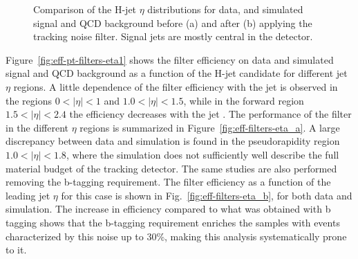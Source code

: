 \begin{figure}[!htb]
\centering
{}
\caption{Comparison of the H-jet $\eta$ distributions for data, and simulated signal and QCD background before (a) and after (b) applying the
tracking noise filter. Signal jets are mostly central in the detector.}
\label{fig:hbbjeteta}
\end{figure}

Figure~\ref{fig:eff-pt-filters-eta1} shows the filter efficiency on data and simulated signal and QCD background as a function 
of the H-jet candidate \pt for different jet $\eta$ regions.
A little dependence of the filter efficiency with the jet \pt is observed in the regions $0 < |\eta| < 1$ and $1.0 < |\eta| < 1.5$, 
while in the forward region $1.5 < |\eta| < 2.4$ the efficiency decreases with the jet \pt. 
The performance of the filter in the different $\eta$ regions is summarized in Figure~\ref{fig:eff-filters-eta_a}.
A large discrepancy between data and simulation is found in the pseudorapidity region $1.0 < |\eta| < 1.8$, 
where the simulation does not sufficiently well describe the full material budget of the tracking detector.
The same studies are also performed removing the b-tagging requirement. The filter efficiency as a function of the leading 
jet $\eta$ for this case is shown in Fig.~\ref{fig:eff-filters-eta_b}, for both data and simulation.
The increase in efficiency compared to what was obtained with b tagging shows that 
the b-tagging requirement enriches the samples with events characterized by this noise up to 30\%, making this analysis systematically prone to it.

